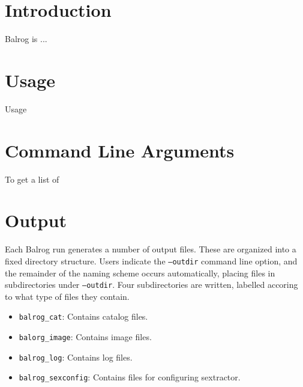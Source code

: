 \documentclass[12pt]{article}
\newcommand{\balrog}{Balrog}
\newcommand{\opt}[1]{\texttt{--#1}}
\begin{document}
\balrogtitlepage

\newpage
\tableofcontents

\newpage
\section{Introduction}
\label{sec:intro}
\balrog{} is ...

\section{Usage}
Usage

\section{Command Line Arguments}
To get a list of

\section{Output}
Each \balrog{} run generates a number of output files. 
These are organized into a fixed directory structure.
Users indicate the \opt{outdir} command line option, and
the remainder of the naming scheme occurs automatically,
placing files in subdirectories under \opt{outdir}.
Four subdirectories are written, labelled accoring to what
type of files they contain. 

\begin{itemize}
	\item \texttt{balrog\_cat}: Contains catalog files.
	\item \texttt{balorg\_image}: Contains image files.
	\item \texttt{balrog\_log}: Contains log files.
	\item \texttt{balrog\_sexconfig}: Contains files for configuring sextractor.
\end{itemize}
\end{document}
